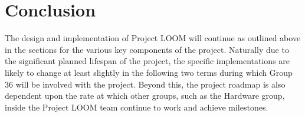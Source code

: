 \documentclass[onecolumn, draftclsnofoot,10pt, compsoc]{IEEEtran}
\begin{document}
\section{Conclusion}
    The design and implementation of Project LOOM will continue as outlined above in the sections for the various key components of the project. Naturally due to the significant planned lifespan of the project, the specific implementations are likely to change at least slightly in the following two terms during which Group 36 will be involved with the project. Beyond this, the project roadmap is also dependent upon the rate at which other groups, such as the Hardware group, inside the Project LOOM team continue to work and achieve milestones. 





\end{document}
